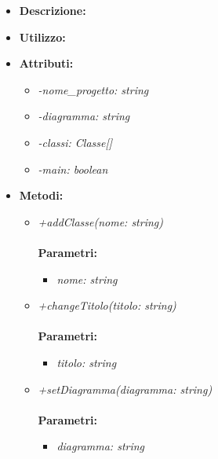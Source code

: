 \begin{itemize}
	\item \textbf{Descrizione:}\\
	
	\item \textbf{Utilizzo:}\\
	
	\item \textbf{Attributi:}
		\begin{itemize}
			\item \emph{-nome\_progetto: string}\\
			
			\item \emph{-diagramma: string}\\
			
			\item \emph{-classi: Classe[]}\\
			
			\item \emph{-main: boolean}\\
			
		\end{itemize}
	\item \textbf{Metodi:}
		\begin{itemize}
			\item \emph{+addClasse(nome: string)}\\
    		\\
    		\textbf{Parametri:}
    		\begin{itemize}
    			\item \emph{nome: string}\\
    			
    		\end{itemize}
    		\item \emph{+changeTitolo(titolo: string)}\\
    		\\
    		\textbf{Parametri:}
    		\begin{itemize}
    			\item \emph{titolo: string}\\
    			
    		\end{itemize}
    		\item \emph{+setDiagramma(diagramma: string)}\\
    		\\
    		\textbf{Parametri:}
    		\begin{itemize}
    			\item \emph{diagramma: string}\\
    			

\end{itemize}
\end{itemize}
\end{itemize}
